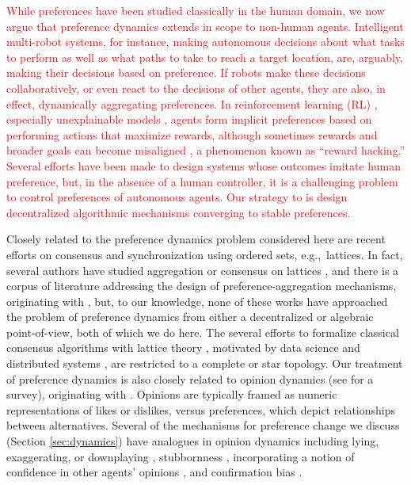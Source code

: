 \documentclass[conference]{ieeeconf}
\begin{document}
\textcolor{red}{While preferences have been studied classically in the human domain, we now argue that preference dynamics extends in scope to non-human agents. Intelligent multi-robot systems, for instance, making autonomous decisions about what tasks to perform as well as what paths to take to reach a target location, are, arguably, making their decisions based on preference. If robots make these decisions collaboratively, or even react to the decisions of other agents, they are also, in effect, dynamically aggregating preferences. In reinforcement learning (RL) \cite{furnkranz2012,wirth2017,natarajan2005}, especially unexplainable models \cite{christiano2017}, agents form implicit preferences based on performing actions that maximize rewards, although sometimes rewards and broader goals can become misaligned \cite{pan2022}, a phenomenon known as ``reward hacking.'' Several efforts \cite{huang2021,korbak2023,ibarz2018} have been made to design systems whose outcomes imitate human preference, but, in the absence of a human controller, it is a challenging problem to control preferences of autonomous agents. Our strategy to is design decentralized algorithmic mechanisms \cite{roughgarden2010} converging to stable preferences.}


Closely related to the preference dynamics problem considered here are recent efforts on consensus \cite{riess2022} and synchronization \cite{riess2023} using ordered sets, e.g.,~lattices. In fact, several authors have studied aggregation or consensus on lattices \cite{karacal2017,chambers2011}, and there is a corpus of literature addressing the design of preference-aggregation mechanisms, originating with \cite{arrow2012}, but, to our knowledge, none of these works have approached the problem of preference dynamics from either a decentralized or algebraic point-of-view, both of which we do here. The several efforts to formalize classical consensus algorithms with lattice theory \cite{barthelemy1991}, motivated by data science \cite{jeanpierre1986} and distributed systems \cite{attiya1995}, are restricted to a complete or star topology. Our treatment of preference dynamics is also closely related to opinion dynamics (see \cite{noorazar2020} for a survey), originating with \cite{degroot1974}. Opinions are typically framed as numeric representations of likes or dislikes, versus preferences, which depict relationships between alternatives. Several of the mechanisms for preference change we discuss (Section \ref{sec:dynamics}) have analogues in opinion dynamics including  lying, exaggerating, or downplaying \cite{hansen2021}, stubbornness \cite{ghaderi2014}, incorporating a notion of confidence in other agents' opinions \cite{hegselmann2002,blondel2009}, and confirmation bias \cite{hayhoe2017}.
\end{document}
